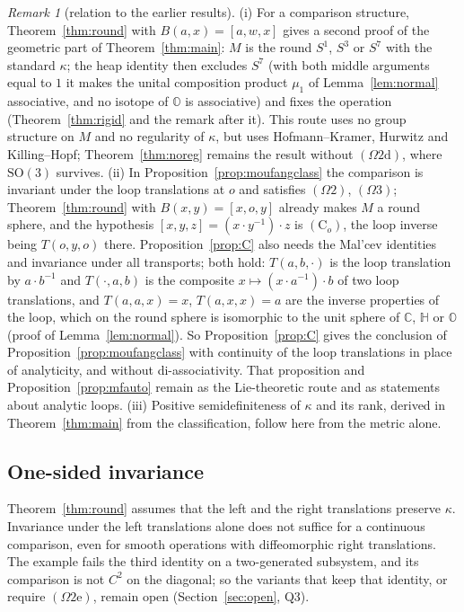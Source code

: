 \documentclass[11pt,reqno]{amsart}
\theoremstyle{definition}
\theoremstyle{remark}
\newtheorem{remark}[theorem]{Remark}
\numberwithin{equation}{section}
\newcommand{\C}{\mathbb{C}}
\newcommand{\HH}{\mathbb{H}}
\newcommand{\hp}[3]{[#1,#2,#3]}
\newcommand{\SO}{\mathrm{SO}}
\begin{document}
\begin{remark}[relation to the earlier results]\label{rem:roundrel}
(i) For a comparison structure, Theorem~\ref{thm:round} with $B(a,x)=\hp awx$ gives a second proof of the geometric part of
Theorem~\ref{thm:main}: $M$ is the round $S^1$, $S^3$ or $S^7$ with the standard $\kappa$; the heap identity then excludes $S^7$ (with both
middle arguments equal to $1$ it makes the unital composition product $\mu_1$ of Lemma~\ref{lem:normal} associative, and no isotope of
$\mathbb O$ is associative) and fixes the operation (Theorem~\ref{thm:rigid} and the remark after it).  This route uses no group structure
on $M$ and no regularity of $\kappa$, but uses Hofmann--Kramer, Hurwitz and Killing--Hopf; Theorem~\ref{thm:noreg} remains the result
without $(\Omega2\mathrm d)$, where $\SO(3)$ survives.  (ii) In Proposition~\ref{prop:moufangclass} the comparison is invariant under the loop
translations at $o$ and satisfies $(\Omega2)$, $(\Omega3)$; Theorem~\ref{thm:round} with $B(x,y)=\hp xoy$ already makes $M$ a round sphere, and
the hypothesis $\hp xyz=(x\cdot y^{-1})\cdot z$ is $(\mathrm C_o)$, the loop inverse being $T(o,y,o)$ there.  Proposition~\ref{prop:C} also needs
the Mal'cev identities and invariance under all transports; both hold: $T(a,b,\cdot)$ is the loop translation by $a\cdot b^{-1}$ and $T(\cdot,a,b)$
is the composite $x\mapsto(x\cdot a^{-1})\cdot b$ of two loop translations, and $T(a,a,x)=x$, $T(a,x,x)=a$ are the inverse properties of the
loop, which on the round sphere is isomorphic to the unit sphere of $\C$, $\HH$ or $\mathbb O$ (proof of Lemma~\ref{lem:normal}).  So
Proposition~\ref{prop:C} gives the conclusion of Proposition~\ref{prop:moufangclass} with continuity of the loop translations in place of
analyticity, and without di-associativity.  That proposition and
Proposition~\ref{prop:mfauto} remain as the Lie-theoretic route and as statements about analytic loops.  (iii) Positive semidefiniteness of
$\kappa$ and its rank, derived in Theorem~\ref{thm:main} from the classification, follow here from the metric alone.
\end{remark}


\subsection{One-sided invariance}\label{sec:onesided}
Theorem~\ref{thm:round} assumes that the left and the right translations preserve $\kappa$.  Invariance under the left translations
alone does not suffice for a continuous comparison, even for smooth operations with diffeomorphic right translations.  The example fails
the third identity on a two-generated subsystem, and its comparison is not $C^2$ on the diagonal; so the variants that keep that identity,
or require $(\Omega2\mathrm e)$, remain open (Section~\ref{sec:open}, Q3).
\end{document}
